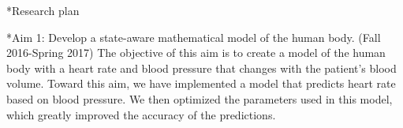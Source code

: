 \documentclass[11pt]{article}
\makeatletter
\renewcommand\subsection{\@startsection
	{subsection}{2}{0mm}
	{-0.05in}
	{-0.5\baselineskip}
	{\normalfont\normalsize\bfseries}}
\renewcommand\section{\@startsection
	{subsection}{2}{0mm}
	{-0.2in}
	{0.05\baselineskip}
	{\normalfont\large\bfseries}}
\makeatother
\begin{document}

\section*{Research plan}

\subsection*{Aim 1: Develop a state-aware mathematical model of the human body. (Fall 2016-Spring 2017)}
The objective of this aim is to create a model of the human body with a heart rate and blood pressure that changes with the patient's blood volume. Toward this aim, we have implemented a model that predicts heart rate based on blood pressure. We then optimized the parameters used in this model, which greatly improved the accuracy of the predictions.
\end{document}

